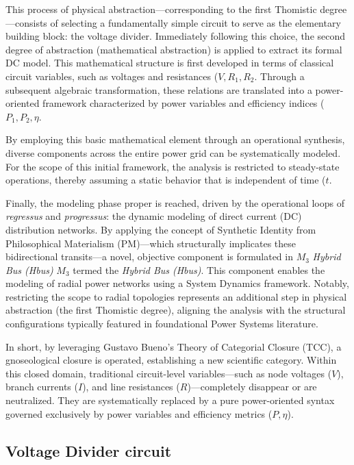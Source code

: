 \documentclass[11pt, a4paper]{article}
\begin{document}
This process of physical abstraction—corresponding to the first Thomistic degree—consists of selecting a fundamentally simple circuit to serve as the elementary building block: the voltage divider. Immediately following this choice, the second degree of abstraction (mathematical abstraction) is applied to extract its formal DC model. This mathematical structure is first developed in terms of classical circuit variables, such as voltages and resistances (\(V, R_1, R_2\). Through a subsequent algebraic transformation, these relations are translated into a power-oriented framework characterized by power variables and efficiency indices (\(P_1, P_2, \eta\).


By employing this basic mathematical element through an operational synthesis, diverse components across the entire power grid can be systematically modeled. For the scope of this initial framework, the analysis is restricted to steady-state operations, thereby assuming a static behavior that is independent of time (\(t\).

Finally, the modeling phase proper is reached, driven by the operational loops of \textit{regressus} and \textit{progressus}:
the dynamic modeling of direct current (DC) distribution networks. By applying the concept of Synthetic Identity from Philosophical Materialism (PM)—which structurally implicates these bidirectional transits—a novel, objective component is formulated in $M_3$
\textit{Hybrid Bus (Hbus)}  $M_3$ termed the \textit{Hybrid Bus (Hbus)}. This component enables the modeling of radial power networks using a System Dynamics framework. Notably, restricting the scope to radial topologies represents an additional step in physical abstraction (the first Thomistic degree), aligning the analysis with the structural configurations typically featured in foundational Power Systems literature.


In short, by leveraging Gustavo Bueno’s Theory of Categorial Closure (TCC), a gnoseological closure is operated, establishing a new scientific category. Within this closed domain, traditional circuit-level variables—such as node voltages ($V$), branch currents ($I$), and line resistances ($R$)—completely disappear or are neutralized. They are systematically replaced by a pure power-oriented syntax governed exclusively by power variables and efficiency metrics ($P, \eta$).



\subsection{Voltage Divider circuit}
\end{document}
